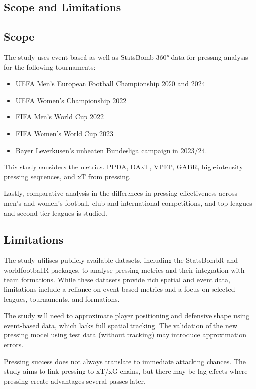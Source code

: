 \subsection{Scope and Limitations}

\subsection{Scope}

The study uses event-based as well as StatsBomb 360° data for pressing analysis for the following tournaments:
\begin{itemize}
    \item UEFA Men's European Football Championship 2020 and 2024
    \item UEFA Women's Championship 2022
    \item FIFA Men's World Cup 2022
    \item FIFA Women's World Cup 2023
    \item Bayer Leverkusen's unbeaten Bundesliga campaign in 2023/24.
\end{itemize}

This study considers the metrics: PPDA, DAxT, VPEP, GABR, high-intensity pressing sequences, and xT from pressing.

Lastly, comparative analysis in the differences in pressing effectiveness across men's and women's football, club and international competitions, and top leagues and second-tier leagues is studied.

\subsection{Limitations}

The study utilises publicly available datasets, including the StatsBombR and worldfootballR packages, to analyse pressing metrics and their integration with team formations. While these datasets provide rich spatial and event data, limitations include a reliance on event-based metrics and a focus on selected leagues, tournaments, and formations.

The study will need to approximate player positioning and defensive shape using event-based data, which lacks full spatial tracking. The validation of the new pressing model using test data (without tracking) may introduce approximation errors.

Pressing success does not always translate to immediate attacking chances. The study aims to link pressing to xT/xG chains, but there may be lag effects where pressing create advantages several passes later.

